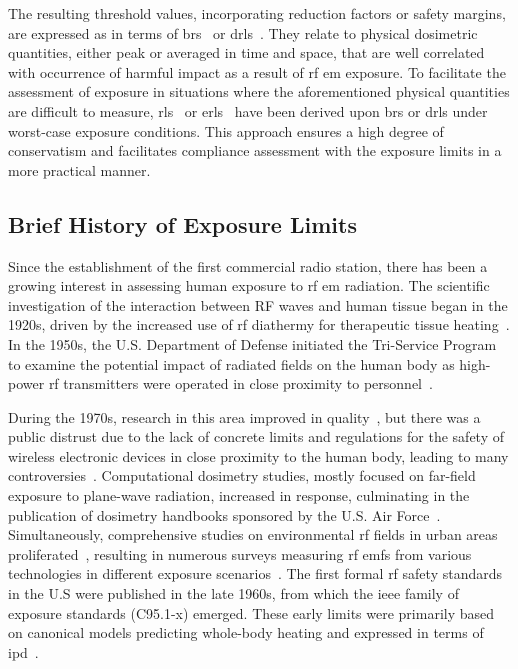 The resulting threshold values, incorporating reduction factors or safety margins, are expressed as in terms of \gls{br}s~\cite{ICNIRP2020Guidelines} or \gls{drl}s~\cite{IEEE2019Standard}.
They relate to physical dosimetric quantities, either peak or averaged in time and space, that are well correlated with occurrence of harmful impact as a result of \gls{rf} \gls{em} exposure.
To facilitate the assessment of exposure in situations where the aforementioned physical quantities are difficult to measure, \gls{rl}s~\cite{ICNIRP2020Guidelines} or \gls{erl}s~\cite{IEEE2019Standard} have been derived upon \gls{br}s or \gls{drl}s under worst-case exposure conditions.
This approach ensures a high degree of conservatism and facilitates compliance assessment with the exposure limits in a more practical manner.

\subsection{Brief History of Exposure Limits}
Since the establishment of the first commercial radio station, there has been a growing interest in assessing human exposure to \gls{rf} \gls{em} radiation.
The scientific investigation of the interaction between RF waves and human tissue began in the 1920s, driven by the increased use of \gls{rf} diathermy for therapeutic tissue heating~\cite{Kovacs1945Electrotherapy}.
In the 1950s, the U.S. Department of Defense initiated the Tri-Service Program to examine the potential impact of radiated fields on the human body as high-power \gls{rf} transmitters were operated in close proximity to personnel~\cite{Lin1994Early}.

During the 1970s, research in this area improved in quality~\cite{Guy1971Analyses}, but there was a public distrust due to the lack of concrete limits and regulations for the safety of wireless electronic devices in close proximity to the human body, leading to many controversies~\cite{Foster2022Three}.
Computational dosimetry studies, mostly focused on far-field exposure to plane-wave radiation, increased in response, culminating in the publication of dosimetry handbooks sponsored by the U.S. Air Force~\cite{Durney1986Radiofrequency}.
Simultaneously, comprehensive studies on environmental \gls{rf} fields in urban areas proliferated~\cite{Tell1976Measurement}, resulting in numerous surveys measuring \gls{rf} \gls{emf}s from various technologies in different exposure scenarios~\cite{Jalilian2019Public}.
The first formal \gls{rf} safety standards in the U.S were published in the late 1960s, from which the \gls{ieee} family of exposure standards (C95.1-x) emerged.
These early limits were primarily based on canonical models predicting whole-body heating and expressed in terms of \gls{ipd}~\cite{Roach2009Radiofrequency}.


